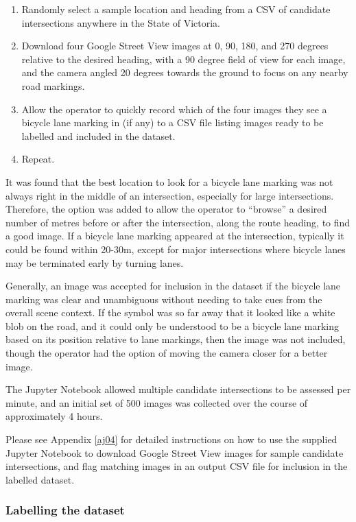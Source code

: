 \documentclass[11pt,twoside]{report}
\begin{document}
\begin{enumerate}
	\item{Randomly select a sample location and heading from a CSV of candidate intersections anywhere in the State of Victoria.}
	\item{Download four Google Street View images at 0, 90, 180, and 270 degrees relative to the desired heading, with a 90 degree field of view for each image, and the camera angled 20 degrees towards the ground to focus on any nearby road markings.}
	\item{Allow the operator to quickly record which of the four images they see a bicycle lane marking in (if any) to a CSV file listing images ready to be labelled and included in the dataset.}
	\item{Repeat.}
\end{enumerate}

It was found that the best location to look for a bicycle lane marking was not always right in the middle of an intersection, especially for large intersections.  Therefore, the option was added to allow the operator to ``browse'' a desired number of metres before or after the intersection, along the route heading, to find a good image.  If a bicycle lane marking appeared at the intersection, typically it could be found within 20-30m, except for major intersections where bicycle lanes may be terminated early by turning lanes.

Generally, an image was accepted for inclusion in the dataset if the bicycle lane marking was clear and unambiguous without needing to take cues from the overall scene context.  If the symbol was so far away that it looked like a white blob on the road, and it could only be understood to be a bicycle lane marking based on its position relative to lane markings, then the image was not included, though the operator had the option of moving the camera closer for a better image.

The Jupyter Notebook allowed multiple candidate intersections to be assessed per minute, and an initial set of 500 images was collected over the course of approximately 4 hours.

Please see Appendix \ref{aj04} for detailed instructions on how to use the supplied Jupyter Notebook to download Google Street View images for sample candidate intersections, and flag matching images in an output CSV file for inclusion in the labelled dataset.


\subsubsection{Labelling the dataset}
\label{s:label}
\end{document}

